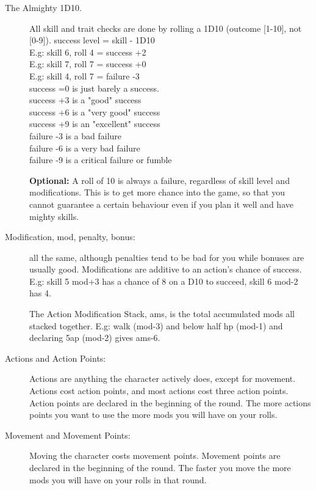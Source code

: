 \begin{description}

\item[The Almighty 1D10.] All skill and trait checks are done by rolling a 1D10 (outcome [1-10], not [0-9]).
success level = skill - 1D10 \\
E.g: skill 6, roll 4 = success +2 \\
E.g: skill 7, roll 7 = success +0 \\
E.g: skill 4, roll 7 = failure -3 \\
success =0 is just barely a success. \\
success +3 is a "good" success \\
success +6 is a "very good" success \\
success +9 is an "excellent" success \\
failure -3 is a bad failure \\
failure -6 is a very bad failure \\
failure -9 is a critical failure or fumble

\textbf{Optional:} A roll of 10 is always a failure, regardless of skill level and modifications. This is to get more chance into the game, so that you cannot guarantee a certain behaviour even if you plan it well and have mighty skills.

\item[Modification, mod, penalty, bonus:] all the same, although penalties tend to be bad for you while bonuses are usually good. Modifications are additive to an action's chance of success. \\
E.g: skill 5 mod+3 has a chance of 8 on a D10 to succeed, skill 6 mod-2 has 4.

The Action Modification Stack, ams, is the total accumulated mods all stacked together. E.g: walk (mod-3) and below half hp (mod-1) and declaring 5ap (mod-2) gives ams-6.

\item[Actions and Action Points:]
Actions are anything the character actively does, except for movement. Actions cost action points, and most actions cost three action points.
Action points are declared in the beginning of the round. The more actions points you want to use the more mods you will have on your rolls.

\item[Movement and Movement Points:]
Moving the character costs movement points. Movement points are declared in the beginning of the round. The faster you move the more mods you will have on your rolls in that round.


\end{description}
